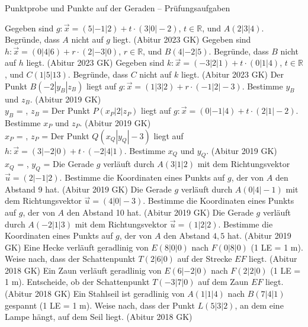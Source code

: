 \begin{aufgabe}{Punktprobe und Punkte auf der Geraden – Prüfungsaufgaben}
\begin{teile}
\teil Gegeben sind $g\colon \vec x = (5 | -1 | 2) + t \cdot (3 | 0 | -2)$, $t \in \mathbb{R}$, und $A(2 | 3 | 4)$. Begründe, dass $A$ nicht auf $g$ liegt. \hfill (Abitur 2023 GK)
\teil Gegeben sind $h\colon \vec x = (0 | 4 | 6) + r \cdot (2 | -3 | 0)$, $r \in \mathbb{R}$, und $B(4 | -2 | 5)$. Begründe, dass $B$ nicht auf $h$ liegt. \hfill (Abitur 2023 GK)
\teil Gegeben sind $k\colon \vec x = (-3 | 2 | 1) + t \cdot (0 | 1 | 4)$, $t \in \mathbb{R}$, und $C(1 | 5 | 13)$. Begründe, dass $C$ nicht auf $k$ liegt. \hfill (Abitur 2023 GK)
\teil Der Punkt $B(-2 | y_B | z_B)$ liegt auf $g\colon \vec x = (1 | 3 | 2) + r \cdot (-1 | 2 | -3)$. Bestimme $y_B$ und $z_B$. \hfill (Abitur 2019 GK) \\ $y_B$ = \leerfeld , $z_B$ = \leerfeld
\teil Der Punkt $P(x_P | 2 | z_P)$ liegt auf $g\colon \vec x = (0 | -1 | 4) + t \cdot (2 | 1 | -2)$. Bestimme $x_P$ und $z_P$. \hfill (Abitur 2019 GK) \\ $x_P$ = \leerfeld , $z_P$ = \leerfeld
\teil Der Punkt $Q(x_Q | y_Q | -3)$ liegt auf $h\colon \vec x = (3 | -2 | 0) + t \cdot (-2 | 4 | 1)$. Bestimme $x_Q$ und $y_Q$. \hfill (Abitur 2019 GK) \\ $x_Q$ = \leerfeld , $y_Q$ = \leerfeld
\teil Die Gerade $g$ verläuft durch $A(3 | 1 | 2)$ mit dem Richtungsvektor $\vec u = (2 | -1 | 2)$. Bestimme die Koordinaten eines Punkts auf $g$, der von $A$ den Abstand 9 hat. \hfill (Abitur 2019 GK)
\teil Die Gerade $g$ verläuft durch $A(0 | 4 | -1)$ mit dem Richtungsvektor $\vec u = (4 | 0 | -3)$. Bestimme die Koordinaten eines Punkts auf $g$, der von $A$ den Abstand 10 hat. \hfill (Abitur 2019 GK)
\teil Die Gerade $g$ verläuft durch $A(-2 | 1 | 3)$ mit dem Richtungsvektor $\vec u = (1 | 2 | 2)$. Bestimme die Koordinaten eines Punkts auf $g$, der von $A$ den Abstand $4{,}5$ hat. \hfill (Abitur 2019 GK)
\teil Eine Hecke verläuft geradlinig von $E(8 | 0 | 0)$ nach $F(0 | 8 | 0)$ (1 LE = 1 m). Weise nach, dass der Schattenpunkt $T(2 | 6 | 0)$ auf der Strecke $EF$ liegt. \hfill (Abitur 2018 GK)
\teil Ein Zaun verläuft geradlinig von $E(6 | -2 | 0)$ nach $F(2 | 2 | 0)$ (1 LE = 1 m). Entscheide, ob der Schattenpunkt $T(-3 | 7 | 0)$ auf dem Zaun $EF$ liegt. \hfill (Abitur 2018 GK)
\teil Ein Stahlseil ist geradlinig von $A(1 | 1 | 4)$ nach $B(7 | 4 | 1)$ gespannt (1 LE = 1 m). Weise nach, dass der Punkt $L(5 | 3 | 2)$, an dem eine Lampe hängt, auf dem Seil liegt. \hfill (Abitur 2018 GK)
\end{teile}
\end{aufgabe}


